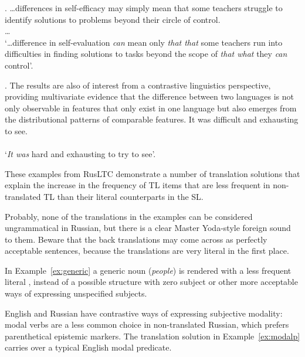 \ex. \label{ex:modalp}\hspace{1pt}
\dots differences in self-efficacy may simply mean that some teachers struggle to identify
solutions to problems beyond their circle of control. \\
\dots {}\\
`\dots difference in self-evaluation \textit{can} mean only \textit{that that} some teachers run into difficulties in finding solutions to tasks beyond the scope of \textit{that what} they \textit{can} control'.

\ex. \label{ex:copula}\hspace{1pt}The results are also of interest from a contrastive linguistics perspective,
providing multivariate evidence that the difference between two languages is not only observable in features that only exist in one language but also emerges from the distributional patterns of comparable features.
It was difficult and exhausting to see. \\
 \\
`\textit{It was} hard and exhausting to try to see'.

\noindent These examples from RusLTC demonstrate a number of translation solutions that explain the
increase in the frequency of TL items that are less frequent in non-translated TL
than their literal counterparts in the SL.

Probably, none of the translations in the examples can be considered ungrammatical in Russian, but there
is a clear Master Yoda-style foreign sound to them. Beware that the back translations may come across as perfectly acceptable sentences, because the translations are very literal in the first place.

In Example~\cref{ex:generic} a generic noun (\textit{people}) is rendered with a less frequent literal , instead of a possible structure with zero subject or other more acceptable ways of expressing unspecified subjects. 

English and Russian have contrastive ways of expressing subjective modality: modal verbs are a less common choice in non-translated Russian, which prefers parenthetical epistemic markers. The translation solution in Example~\cref{ex:modalp} carries over a typical English modal predicate. 

